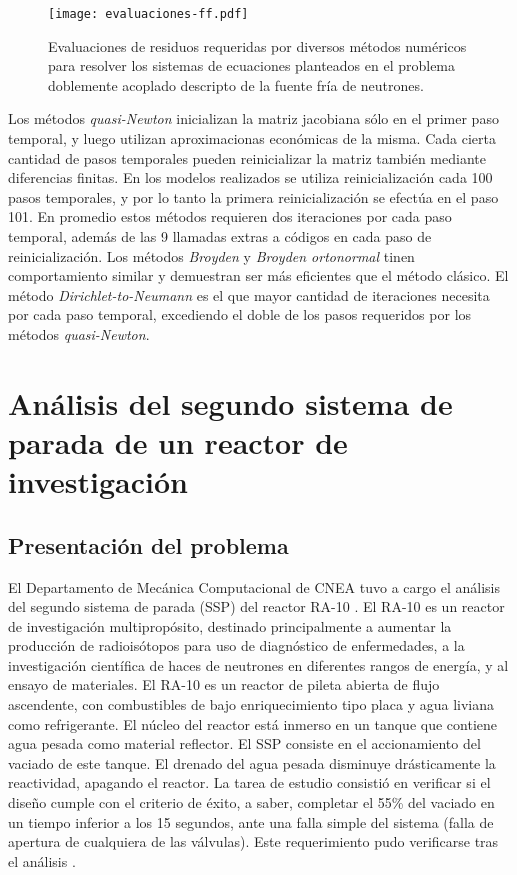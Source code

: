 \begin{figure}[ht]
\centering{}\texttt{[image: evaluaciones-ff.pdf]}
\caption
{Evaluaciones de residuos requeridas por diversos métodos numéricos para resolver los sistemas de ecuaciones planteados
 en el problema doblemente acoplado descripto de la fuente fría de neutrones.} \label{iteraciones_ri} 
\end{figure}

Los métodos \textit{quasi-Newton} inicializan la matriz jacobiana sólo en el primer paso temporal,
y luego utilizan aproximacionas económicas de la misma. 
Cada cierta cantidad de pasos temporales pueden reinicializar la matriz también mediante diferencias finitas. 
En los modelos realizados se utiliza reinicialización cada 100 pasos temporales, 
y por lo tanto la primera reinicialización se efectúa en el paso 101.
En promedio estos métodos requieren dos iteraciones por cada paso temporal, 
además de las 9 llamadas extras a códigos en cada paso de reinicialización.
Los métodos \textit{Broyden} y \textit{Broyden ortonormal} tinen comportamiento similar y demuestran ser más eficientes que el método clásico.
El método \textit{Dirichlet-to-Neumann} es el que mayor cantidad de iteraciones necesita por cada paso temporal, 
excediendo el doble de los pasos requeridos por los métodos \textit{quasi-Newton}.

\section{Análisis del segundo sistema de parada de un reactor de investigación}
\label{3:mockup}

\subsection*{Presentación del problema}
El Departamento de Mecánica Computacional de CNEA tuvo a cargo el análisis del segundo sistema de parada (SSP) del reactor RA-10 \cite{ra10}.
El RA-10 es un reactor de investigación multipropósito, destinado principalmente a aumentar la producción de radioisótopos para uso de diagnóstico de enfermedades,
a la investigación científica de haces de neutrones en diferentes rangos de energía,
y al ensayo de materiales.
El RA-10 es un reactor de pileta abierta de flujo ascendente, con combustibles de bajo enriquecimiento tipo placa y agua liviana como refrigerante.
El núcleo del reactor está inmerso en un tanque que contiene agua pesada como material reflector.
El SSP consiste en el accionamiento del vaciado de este tanque.
El drenado del agua pesada disminuye drásticamente la reactividad, apagando el reactor.
La tarea de estudio consistió en verificar si el diseño cumple con el criterio de éxito,
a saber, completar el 55\% del vaciado en un tiempo inferior a los 15 segundos,
ante una falla simple del sistema (falla de apertura de cualquiera de las válvulas).
Este requerimiento pudo verificarse tras el análisis \cite{cnea-informe-ra10}.

